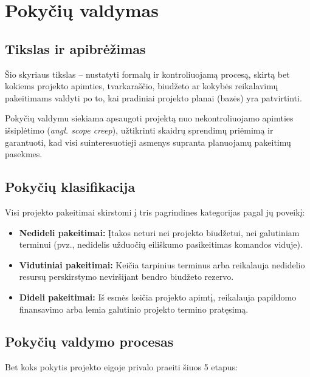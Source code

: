 \section{Pokyčių valdymas}

\subsection{Tikslas ir apibrėžimas}
Šio skyriaus tikslas – nustatyti formalų ir kontroliuojamą procesą, skirtą bet kokiems projekto apimties, tvarkaraščio, biudžeto ar kokybės reikalavimų pakeitimams valdyti po to, kai pradiniai projekto planai (bazės) yra patvirtinti. 

Pokyčių valdymu siekiama apsaugoti projektą nuo nekontroliuojamo apimties išsiplėtimo (\textit{angl. scope creep}), užtikrinti skaidrų sprendimų priėmimą ir garantuoti, kad visi suinteresuotieji asmenys supranta planuojamų pakeitimų pasekmes.

\subsection{Pokyčių klasifikacija}
Visi projekto pakeitimai skirstomi į tris pagrindines kategorijas pagal jų poveikį:
\begin{itemize}
    \item \textbf{Nedideli pakeitimai:} Įtakos neturi nei projekto biudžetui, nei galutiniam terminui (pvz., nedidelis užduočių eiliškumo pasikeitimas komandos viduje).
    \item \textbf{Vidutiniai pakeitimai:} Keičia tarpinius terminus arba reikalauja nedidelio resursų perskirstymo neviršijant bendro biudžeto rezervo.
    \item \textbf{Dideli pakeitimai:} Iš esmės keičia projekto apimtį, reikalauja papildomo finansavimo arba lemia galutinio projekto termino pratęsimą.
\end{itemize}

\subsection{Pokyčių valdymo procesas}
Bet koks pokytis projekto eigoje privalo praeiti šiuos 5 etapus:

